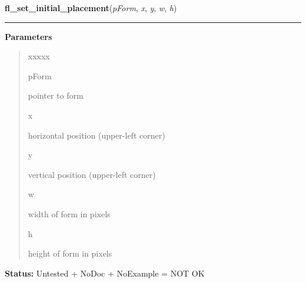 \hspace{.8\funcindent}\begin{boxedminipage}{\funcwidth}

    \raggedright \textbf{fl\_set\_initial\_placement}(\textit{pForm}, \textit{x}, \textit{y}, \textit{w}, \textit{h})

    \vspace{-1.5ex}

    \rule{\textwidth}{0.5\fboxrule}
\setlength{\parskip}{2ex}
\setlength{\parskip}{1ex}
      \textbf{Parameters}
      \vspace{-1ex}

      \begin{quote}
        \begin{Ventry}{xxxxx}

          \item[pForm]

          pointer to form

          \item[x]

          horizontal position (upper-left corner)

          \item[y]

          vertical position (upper-left corner)

          \item[w]

          width of form in pixels

          \item[h]

          height of form in pixels

        \end{Ventry}

      \end{quote}

\textbf{Status:} Untested + NoDoc + NoExample = NOT OK



    \end{boxedminipage}

    \label{xformslib:library:fl_show_form}

    \vspace{0.5ex}

